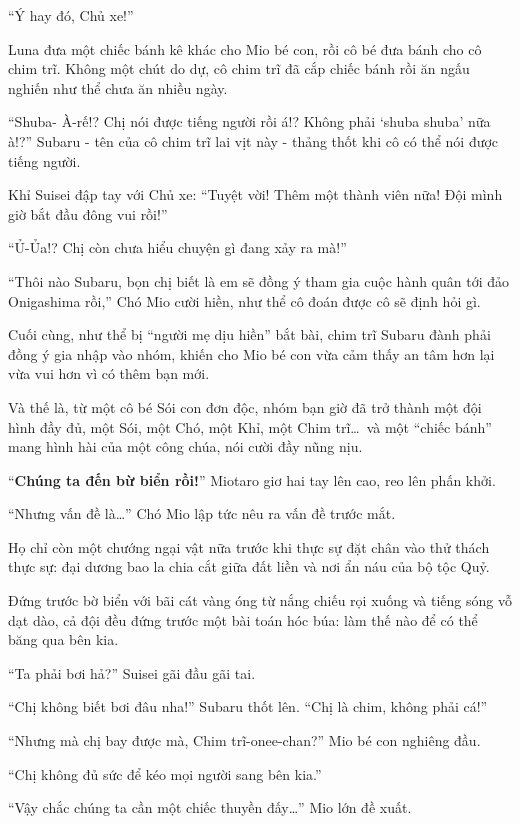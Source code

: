 \documentclass[../main.tex]{subfiles}
\begin{document}
``Ý hay đó, Chủ xe!''

Luna đưa một chiếc bánh kê khác cho Mio bé con, rồi cô bé đưa bánh cho cô chim trĩ. Không một chút do dự, cô chim trĩ đã cắp chiếc bánh rồi ăn ngấu nghiến như thể chưa ăn nhiều ngày.

``Shuba- À-rế!? Chị nói được tiếng người rồi á!? Không phải `shuba shuba' nữa à!?'' Subaru - tên của cô chim trĩ lai vịt này - thảng thốt khi cô có thể nói được tiếng người.

Khỉ Suisei đập tay với Chủ xe: ``Tuyệt vời! Thêm một thành viên nữa! Đội mình giờ bắt đầu đông vui rồi!''

``Ủ-Ủa!? Chị còn chưa hiểu chuyện gì đang xảy ra mà!''

``Thôi nào Subaru, bọn chị biết là em sẽ đồng ý tham gia cuộc hành quân tới đảo Onigashima rồi,'' Chó Mio cười hiền, như thể cô đoán được cô sẽ định hỏi gì.

Cuối cùng, như thể bị ``người mẹ dịu hiền'' bắt bài, chim trĩ Subaru đành phải đồng ý gia nhập vào nhóm, khiến cho Mio bé con vừa cảm thấy an tâm hơn lại vừa vui hơn vì có thêm bạn mới.

\ct

Và thế là, từ một cô bé Sói con đơn độc, nhóm bạn giờ đã trở thành một đội hình đầy đủ, một Sói, một Chó, một Khỉ, một Chim trĩ\dots\ và một ``chiếc bánh'' mang hình hài của một công chúa, nói cười đầy nũng nịu.

``\textbf{Chúng ta đến bừ biển rồi!}'' Miotaro giơ hai tay lên cao, reo lên phấn khởi.

``Nhưng vấn đề là\dots'' Chó Mio lập tức nêu ra vấn đề trước mắt.

Họ chỉ còn một chướng ngại vật nữa trước khi thực sự đặt chân vào thử thách thực sự: đại dương bao la chia cắt giữa đất liền và nơi ẩn náu của bộ tộc Quỷ.

Đứng trước bờ biển với bãi cát vàng óng từ nắng chiếu rọi xuống và tiếng sóng vỗ dạt dào, cả đội đều đứng trước một bài toán hóc búa: làm thế nào để có thể băng qua bên kia.

``Ta phải bơi hả?'' Suisei gãi đầu gãi tai.

``Chị không biết bơi đâu nha!'' Subaru thốt lên. ``Chị là chim, không phải cá!''

``Nhưng mà chị bay được mà, Chim trĩ-onee-chan?'' Mio bé con nghiêng đầu.

``Chị không đủ sức để kéo mọi người sang bên kia.''

``Vậy chắc chúng ta cần một chiếc thuyền đấy\dots'' Mio lớn đề xuất.
\end{document}
